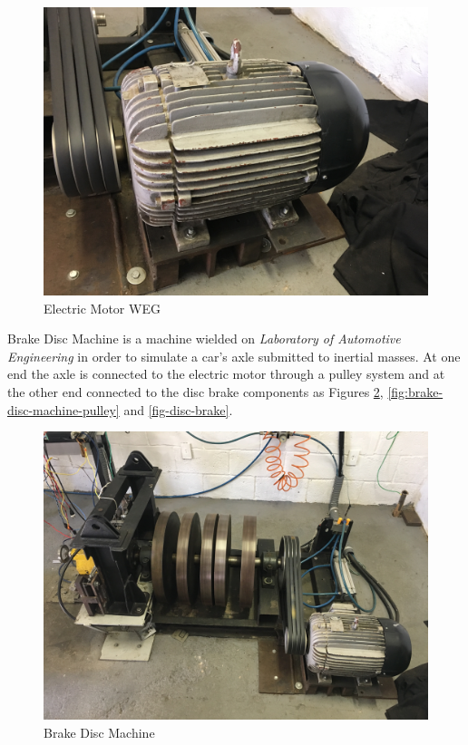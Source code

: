 		\begin{figure}[htbp]
			\centering
			\includegraphics[scale=0.05]{figuras/fig-electric-motor}
			\caption{Electric Motor WEG}
			\label{fig:electric-motor}
		\end{figure}
		\par

		Brake Disc Machine is a machine wielded on \textit{Laboratory of Automotive Engineering} in order to simulate a car's axle submitted to inertial masses. At one end the axle is connected to the electric motor through a pulley system and at the other end connected to the disc brake components as Figures \ref{fig:brake-disc-machine}, \ref{fig:brake-disc-machine-pulley} and \ref{fig-disc-brake}.

		\begin{figure}[htbp]
			\centering
			\includegraphics[scale=0.05]{figuras/fig-brake-disc-machine}
			\caption{Brake Disc Machine}
			\label{fig:brake-disc-machine}
		\end{figure}

